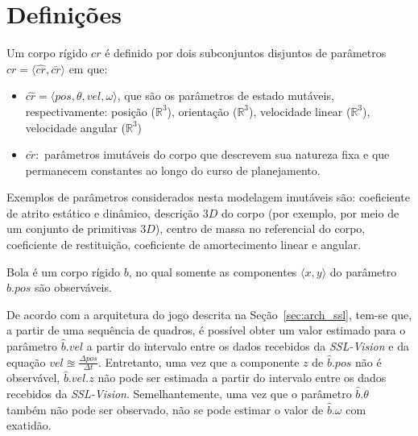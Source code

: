 \section{Definições}\label{sec:defs}

\begin{defi}
  Um corpo rígido $cr$ é definido por dois subconjuntos disjuntos de parâmetros
  $cr= \langle \hat{cr}, \bar{cr} \rangle$ em que:

  \begin{itemize}
    \item $\hat{cr} = \langle pos, \theta, vel, \omega \rangle$, que são os
      parâmetros de estado mutáveis, respectivamente: posição ($\mathbb{R}
      ^{3}$), orientação ($\mathbb{R} ^{3}$), velocidade linear ($\mathbb{R}
      ^{3}$), velocidade angular ($\mathbb{R} ^{3}$)

    \item $\bar{cr} :$ parâmetros imutáveis do corpo que descrevem sua natureza
      fixa e que permanecem constantes ao longo do curso de planejamento.
  \end{itemize}
\end{defi}

Exemplos de parâmetros considerados nesta modelagem imutáveis são: coeficiente
de atrito estático e dinâmico, descrição $3D$ do corpo (por exemplo, por meio de
um conjunto de primitivas $3D$), centro de massa no referencial do corpo,
coeficiente de restituição, coeficiente de amortecimento linear e angular.

\begin{defi}[Bola]\label{def:bola}
  Bola é um corpo rígido $b$, no qual somente as componentes $\langle x,y
  \rangle$ do parâmetro $\hat{b}.pos$ são observáveis.
\end{defi}

De acordo com a arquitetura do jogo descrita na Seção~\ref{sec:arch_ssl}, tem-se
que, a partir de uma sequência de quadros, é possível obter um valor estimado
para o parâmetro $\hat{b}.vel$ a partir do intervalo entre os dados recebidos da
\textit{SSL-Vision} e da equação $ vel \approxeq \frac{\Delta pos}{\Delta t} $.
Entretanto, uma vez que a componente $z$ de $\hat{b}.pos$ não é observável,
$\hat{b}.vel.z$ não pode ser estimada a partir do intervalo entre os dados
recebidos da \textit{SSL-Vision}. Semelhantemente,  uma vez que o parâmetro
$\hat{b}.\theta$ também não pode ser observado, não se pode estimar o valor de
$\hat{b}.\omega$ com exatidão.


